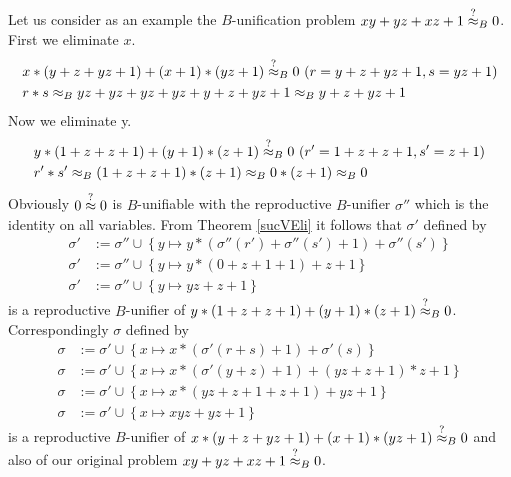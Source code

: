 		Let us consider as an example the $B$-unification problem $xy+yz+xz+1\stackrel{?}{\approx}_B0$. First we eliminate $x$.
		\begin{align*}
		& x*(y+z+yz+1)+(x+1)*(yz+1)\approxq_B0\ (r=y+z+yz+1,s=yz+1)\\
		& r*s\approx_Byz+yz+yz+yz+y+z+yz+1\approx_By+z+yz+1
		\end{align*}
		Now we eliminate y.
		\begin{align*}
		& y*(1+z+z+1)+(y+1)*(z+1)\stackrel{?}{\approx}_B0\ (r'=1+z+z+1,s'=z+1)\\
		& r'*s'\approx_B(1+z+z+1)*(z+1)\approx_B0*(z+1)\approx_B0
		\end{align*}
		Obviously $0\stackrel{?}{\approx}0$ is $B$-unifiable with the reproductive $B$-unifier $\sigma''$ which is the identity on all variables. From Theorem \ref{sucVEli} it follows that $\sigma'$ defined by
		\begin{align*}
		\sigma'&:=\sigma''\cup\left\lbrace y\mapsto y*(\sigma''(r')+\sigma''(s')+1)+\sigma''(s')\right\rbrace\\
		\sigma'&:=\sigma''\cup\left\lbrace y\mapsto y*(0+z+1+1)+z+1\right\rbrace\\
		\sigma'&:=\sigma''\cup\left\lbrace y\mapsto yz+z+1\right\rbrace
		\end{align*}
		is a reproductive $B$-unifier of $y*(1+z+z+1)+(y+1)*(z+1)\stackrel{?}{\approx}_B0$. Correspondingly $\sigma$ defined by
		\begin{align*}
		\sigma&:=\sigma'\cup\left\lbrace x\mapsto x*(\sigma'(r+s)+1)+\sigma'(s)\right\rbrace\\
		\sigma&:=\sigma'\cup\left\lbrace x\mapsto x*(\sigma'(y+z)+1)+(yz+z+1)*z+1\right\rbrace\\
		\sigma&:=\sigma'\cup\left\lbrace x\mapsto x*(yz+z+1+z+1)+yz+1\right\rbrace\\
		\sigma&:=\sigma'\cup\left\lbrace x\mapsto xyz+yz+1\right\rbrace
		\end{align*}
		is a reproductive $B$-unifier of $x*(y+z+yz+1)+(x+1)*(yz+1)\stackrel{?}{\approx}_B0$ and also of our original problem $xy+yz+xz+1\stackrel{?}{\approx}_B0$.
